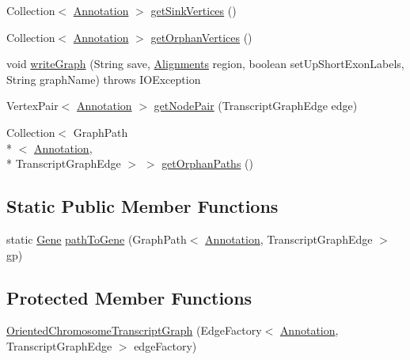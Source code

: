 \begin{DoxyCompactItemize}
\item 
Collection$<$ \hyperlink{interfaceumms_1_1core_1_1annotation_1_1_annotation}{Annotation} $>$ \hyperlink{classumms_1_1core_1_1scripture_1_1_oriented_chromosome_transcript_graph_ade41013e156feeae401801be1ab08c03}{get\+Sink\+Vertices} ()
\item 
Collection$<$ \hyperlink{interfaceumms_1_1core_1_1annotation_1_1_annotation}{Annotation} $>$ \hyperlink{classumms_1_1core_1_1scripture_1_1_oriented_chromosome_transcript_graph_a3d428fc8927b3ebb4051f4d3858cc0ac}{get\+Orphan\+Vertices} ()
\item 
void \hyperlink{classumms_1_1core_1_1scripture_1_1_oriented_chromosome_transcript_graph_a6c482f812c7d5dd219106fe0824fbf6e}{write\+Graph} (String save, \hyperlink{classbroad_1_1pda_1_1datastructures_1_1_alignments}{Alignments} region, boolean set\+Up\+Short\+Exon\+Labels, String graph\+Name)  throws I\+O\+Exception 
\item 
Vertex\+Pair$<$ \hyperlink{interfaceumms_1_1core_1_1annotation_1_1_annotation}{Annotation} $>$ \hyperlink{classumms_1_1core_1_1scripture_1_1_oriented_chromosome_transcript_graph_a3e30facaf439c3a3b0730e1fbcdfcab2}{get\+Node\+Pair} (Transcript\+Graph\+Edge edge)
\item 
Collection$<$ Graph\+Path\\*
$<$ \hyperlink{interfaceumms_1_1core_1_1annotation_1_1_annotation}{Annotation}, \\*
Transcript\+Graph\+Edge $>$ $>$ \hyperlink{classumms_1_1core_1_1scripture_1_1_oriented_chromosome_transcript_graph_a4d84a0c47daf982d58aa6057531e0294}{get\+Orphan\+Paths} ()
\end{DoxyCompactItemize}
\subsection*{Static Public Member Functions}
\begin{DoxyCompactItemize}
\item 
static \hyperlink{classumms_1_1core_1_1annotation_1_1_gene}{Gene} \hyperlink{classumms_1_1core_1_1scripture_1_1_oriented_chromosome_transcript_graph_aca369a009088258a38a5ec259602b2a2}{path\+To\+Gene} (Graph\+Path$<$ \hyperlink{interfaceumms_1_1core_1_1annotation_1_1_annotation}{Annotation}, Transcript\+Graph\+Edge $>$ gp)
\end{DoxyCompactItemize}
\subsection*{Protected Member Functions}
\begin{DoxyCompactItemize}
\item 
\hyperlink{classumms_1_1core_1_1scripture_1_1_oriented_chromosome_transcript_graph_af9386292113ce7463c996738ee129d18}{Oriented\+Chromosome\+Transcript\+Graph} (Edge\+Factory$<$ \hyperlink{interfaceumms_1_1core_1_1annotation_1_1_annotation}{Annotation}, Transcript\+Graph\+Edge $>$ edge\+Factory)
\end{DoxyCompactItemize}


